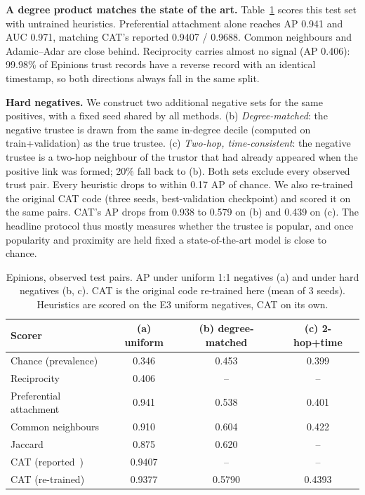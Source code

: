 \documentclass[conference]{IEEEtran}
\begin{document}
\textbf{A degree product matches the state of the art.} Table~\ref{tab:motivation} scores this test set with untrained heuristics. Preferential attachment alone reaches AP 0.941 and AUC 0.971, matching CAT's reported 0.9407 / 0.9688. Common neighbours and Adamic--Adar are close behind. Reciprocity carries almost no signal (AP 0.406): 99.98\% of Epinions trust records have a reverse record with an identical timestamp, so both directions always fall in the same split.

\textbf{Hard negatives.} We construct two additional negative sets for the same positives, with a fixed seed shared by all methods.
(b) \emph{Degree-matched}: the negative trustee is drawn from the same in-degree decile (computed on train+validation) as the true trustee.
(c) \emph{Two-hop, time-consistent}: the negative trustee is a two-hop neighbour of the trustor that had already appeared when the positive link was formed; 20\% fall back to (b).
Both sets exclude every observed trust pair. Every heuristic drops to within 0.17 AP of chance. We also re-trained the original CAT code (three seeds, best-validation checkpoint) and scored it on the same pairs. CAT's AP drops from 0.938 to 0.579 on (b) and 0.439 on (c). The headline protocol thus mostly measures whether the trustee is popular, and once popularity and proximity are held fixed a state-of-the-art model is close to chance.

\begin{table}[t]
\centering
\caption{Epinions, observed test pairs. AP under uniform 1:1 negatives (a) and under hard negatives (b, c). CAT is the original code re-trained here (mean of 3 seeds). Heuristics are scored on the E3 uniform negatives, CAT on its own.}
\label{tab:motivation}
\setlength{\tabcolsep}{4pt}
\begin{tabular}{lccc}
\toprule
Scorer & (a) uniform & (b) degree-matched & (c) 2-hop+time \\
\midrule
Chance (prevalence) & 0.346 & 0.453 & 0.399 \\
Reciprocity & 0.406 & -- & -- \\
Preferential attachment & 0.941 & 0.538 & 0.401 \\
Common neighbours & 0.910 & 0.604 & 0.422 \\
Jaccard & 0.875 & 0.620 & -- \\
\midrule
CAT (reported~\cite{wang2025cat}) & 0.9407 & -- & -- \\
CAT (re-trained) & 0.9377 & 0.5790 & 0.4393 \\
\bottomrule
\end{tabular}
\end{table}
\end{document}
